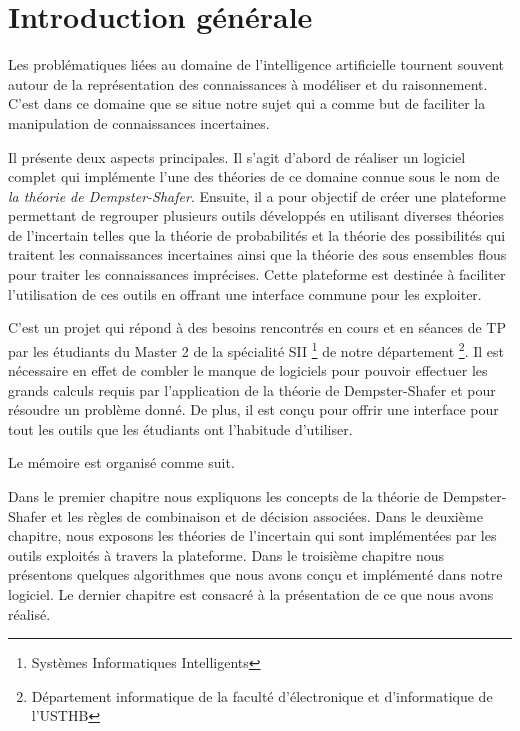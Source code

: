 {}
\chapter*{Introduction générale}
Les problématiques liées au domaine de l'intelligence artificielle tournent souvent autour de la représentation
des connaissances à modéliser et du raisonnement. C'est dans ce domaine que se situe notre sujet qui a comme but
de faciliter la manipulation de connaissances incertaines.

Il présente deux aspects principales. Il s'agit d'abord de réaliser un logiciel complet qui implémente l'une des
théories de ce domaine connue sous le nom de \emph{la théorie de Dempster-Shafer}. Ensuite, il a pour objectif de
créer une plateforme permettant de regrouper plusieurs outils développés en utilisant diverses théories de l'incertain
telles que la théorie de probabilités et la théorie des possibilités qui traitent les connaissances incertaines ainsi
que la théorie des sous ensembles flous pour traiter les connaissances imprécises. Cette plateforme est destinée à
faciliter l'utilisation de ces outils en offrant une interface commune pour les exploiter.

C'est un projet qui répond à des besoins rencontrés en cours et en séances de TP par les étudiants du Master 2 de la
spécialité SII \footnote{Systèmes Informatiques Intelligents} de notre département \footnote{Département informatique
de la faculté d'électronique et d'informatique de l'USTHB}. Il est nécessaire en effet de combler le manque de logiciels
pour pouvoir effectuer les grands calculs requis par l'application de la théorie de Dempster-Shafer et pour résoudre un
problème donné. De plus, il est conçu pour offrir une interface pour tout les outils que les étudiants ont l'habitude
d'utiliser.

Le mémoire est organisé comme suit.

Dans le premier chapitre nous expliquons les concepts de la théorie de Dempster-Shafer et les règles de combinaison
et de décision associées. Dans le deuxième chapitre, nous exposons les théories de l'incertain qui sont implémentées
par les outils exploités à travers la plateforme. Dans le troisième chapitre nous présentons quelques algorithmes que
nous avons conçu et implémenté dans notre logiciel. Le dernier chapitre est consacré à la présentation de ce que
nous avons réalisé.